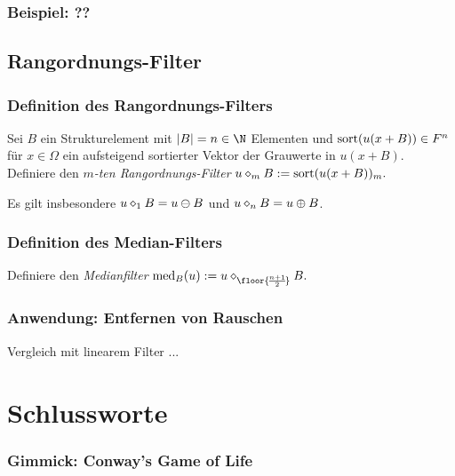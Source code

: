 \documentclass{beamer}
\begin{document}
\begin{frame}
    \frametitle{Beispiel: ??}
\end{frame}

\subsection{Rangordnungs-Filter}

\begin{frame}
    \frametitle{Definition des Rangordnungs-Filters}
    \begin{definition}
        Sei $B$ ein Strukturelement mit $|B| = n \in \N$ Elementen und $\operatorname{sort}(u(x+B)) \in F^n$ für $x \in \Omega$ ein aufsteigend sortierter Vektor der Grauwerte in $u(x+B)$.
        Definiere den \emph{$m$-ten Rangordnungs-Filter}
        \begin{math}
            u \mathbin{\diamond}_m B := \operatorname{sort}(u(x+B))_m.
        \end{math}
    \end{definition}
    Es gilt insbesondere $u \mathbin{\diamond}_1 B = u \ominus B$ und $u \mathbin{\diamond}_n B = u \oplus B$.
\end{frame}

\begin{frame}
    \frametitle{Definition des Median-Filters}
    \begin{definition}
        Definiere den \emph{Medianfilter}
        \begin{math}
            \med_B(u) := u \rankorder_{\floor{\!\frac{n+1}{2}\!}} B.
        \end{math}
    \end{definition}
\end{frame}

\begin{frame}
    \frametitle{Anwendung: Entfernen von Rauschen}
    Vergleich mit linearem Filter ...
\end{frame}



%

\section{Schlussworte}

\begin{frame}
    \frametitle{Gimmick: Conway's Game of Life}
\end{frame}
\end{document}
